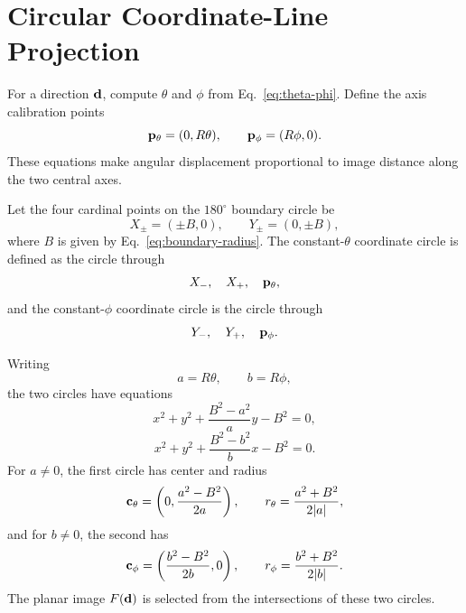 \section{Circular Coordinate-Line Projection}
For a direction $\vb d$, compute $\theta$ and $\phi$ from Eq.~\eqref{eq:theta-phi}.  Define the axis calibration points
\begin{equation}
  \vb p_\theta=(0,R\theta),
  \qquad
  \vb p_\phi=(R\phi,0).
  \label{eq:axis-calibration-points}
\end{equation}
These equations make angular displacement proportional to image distance along the two central axes.

Let the four cardinal points on the $180^\circ$ boundary circle be
\begin{equation}
  X_\pm=(\pm B,0),
  \qquad
  Y_\pm=(0,\pm B),
  \label{eq:cardinal-points}
\end{equation}
where $B$ is given by Eq.~\eqref{eq:boundary-radius}.  The constant-$\theta$ coordinate circle is defined as the circle through
\begin{equation}
  X_-,\quad X_+,\quad \vb p_\theta,
\end{equation}
and the constant-$\phi$ coordinate circle is the circle through
\begin{equation}
  Y_-,\quad Y_+,\quad \vb p_\phi.
\end{equation}

Writing
\begin{equation}
  a=R\theta,
  \qquad
  b=R\phi,
\end{equation}
the two circles have equations
\begin{equation}
  x^2+y^2+\frac{B^2-a^2}{a}y-B^2=0,
  \label{eq:theta-circle}
\end{equation}
\begin{equation}
  x^2+y^2+\frac{B^2-b^2}{b}x-B^2=0.
  \label{eq:phi-circle}
\end{equation}
For $a\neq0$, the first circle has center and radius
\begin{equation}
  \vb c_\theta=
  \left(0,\frac{a^2-B^2}{2a}\right),
  \qquad
  r_\theta=\frac{a^2+B^2}{2|a|},
  \label{eq:theta-circle-data}
\end{equation}
and for $b\neq0$, the second has
\begin{equation}
  \vb c_\phi=
  \left(\frac{b^2-B^2}{2b},0\right),
  \qquad
  r_\phi=\frac{b^2+B^2}{2|b|}.
  \label{eq:phi-circle-data}
\end{equation}
The planar image $F(\vb d)$ is selected from the intersections of these two circles.

